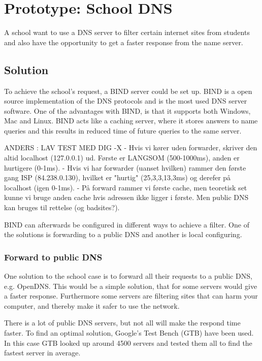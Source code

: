 \documentclass[Preamble]{subfiles}
\begin{document}
\chapter{Prototype: School DNS}
A school want to use a DNS server to filter certain internet sites from students and also have the opportunity to get a faster response from the name server. 

\section{Solution}
To achieve the school's request, a BIND server could be set up. BIND is a open source implementation of the DNS protocols and is the most used DNS server software. One of the advantages with BIND, is that it supports both Windows, Mac and Linux. BIND acts like a caching server, where it stores answers to name queries and this results in reduced time of future queries to the same server.

ANDERS : LAV TEST MED DIG -X
- Hvis vi kører uden forwarder, skriver den altid localhost (127.0.0.1) ud. Første er LANGSOM (500-1000ms), anden er hurtigere (0-1ms).
- Hvis vi har forwarder (uanset hvilken) rammer den første gang ISP (84.238.0.130), hvilket er "hurtig" (25,3,3,13,3ms) og derefer på localhost (igen 0-1ms).
- På forward rammer vi første cache, men teoretisk set kunne vi bruge anden cache hvis adressen ikke ligger i første. Men public DNS kan bruges til rettelse (og badsites?).

BIND can afterwards be configured in different ways to achieve a filter. One of the solutions is forwarding to a public DNS and another is local configuring.

\subsection{Forward to public DNS}

One solution to the school case is to forward all their requests to a public DNS, e.g. OpenDNS. This would be a simple solution, that for some servers would give a faster response. Furthermore some servers are filtering sites that can harm your computer, and thereby make it safer to use the network.

There is a lot of public DNS servers, but not all will make the respond time faster. To find  an optimal solution, Google's Test Bench (GTB) have been used. In this case GTB looked up around 4500 servers and tested them all to find the fastest server in average.
\end{document}
